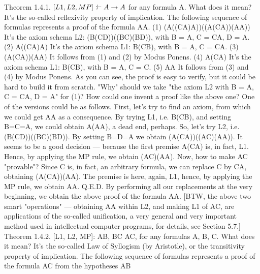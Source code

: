 Theorem 1.4.1. \([L1, L2, MP]: \vdash A\rightarrow A\) for any formula A. What does it mean? It's the so-called
reflexivity property of implication.
The following sequence of formulas represents a proof of the formula A\IMPLIES A.
(1) (A\IMPLIES ((C\IMPLIES A)\IMPLIES A))\IMPLIES ((A\IMPLIES (C\IMPLIES A))\IMPLIES (A\IMPLIES A)) It's the axiom schema L2: (B\IMPLIES (C\IMPLIES D))\IMPLIES ((B\IMPLIES C)\IMPLIES (B\IMPLIES D)), with B = A, C = C\IMPLIES A, D = A.  (2) A\IMPLIES ((C\IMPLIES A)\IMPLIES A) It's the axiom schema L1: B\IMPLIES (C\IMPLIES B), with B = A, C = C\IMPLIES A.  (3) (A\IMPLIES (C\IMPLIES A))\IMPLIES (A\IMPLIES A) It follows from (1) and (2) by Modus Ponens.  (4) A\IMPLIES (C\IMPLIES A) It's the axiom schema L1: B\IMPLIES (C\IMPLIES B), with B = A, C = C.  (5) A\IMPLIES A It follows from (3) and (4) by Modus Ponens.
As you can see, the proof is easy to verify, but it could be hard to build it from scratch. "Why" should we
take "the axiom L2 with B = A, C = C\IMPLIES A, D = A" for (1)?
How could one invent a proof like the above one? One of the versions could be as follows. First, let's try to find an axiom,
from which we could get A\IMPLIES A as a consequence. By trying L1, i.e. B\IMPLIES (C\IMPLIES B), and setting B=C=A, we could obtain
A\IMPLIES (A\IMPLIES A), a dead end, perhaps. So, let's try L2, i.e. (B\IMPLIES (C\IMPLIES D))\IMPLIES ((B\IMPLIES C)\IMPLIES (B\IMPLIES D)). By setting B=D=A we obtain
(A\IMPLIES (C\IMPLIES A))\IMPLIES ((A\IMPLIES C)\IMPLIES (A\IMPLIES A)). It seems to be a good decision --- because the first premise A\IMPLIES (C\IMPLIES A) is, in fact, L1.
Hence, by applying the MP rule, we obtain (A\IMPLIES C)\IMPLIES (A\IMPLIES A). Now, how to make A\IMPLIES C "provable"? Since C is, in fact, an
arbitrary formula, we can replace C by C\IMPLIES A, obtaining (A\IMPLIES (C\IMPLIES A))\IMPLIES (A\IMPLIES A). The premise is here, again, L1, hence, by
applying the MP rule, we obtain A\IMPLIES A. Q.E.D. By performing all our replacements at the very beginning, we obtain the above
proof of the formula A\IMPLIES A. [BTW, the above two smart "operations" --- obtaining A\IMPLIES A within L2, and making L1 of A\IMPLIES C,
are applications of the so-called unification, a very general and very important method used in intellectual computer programs,
for details, see Section 5.7.]
Theorem 1.4.2. [L1, L2, MP]: A\IMPLIES B, B\IMPLIES C \vdash A\IMPLIES C, for any formulas A, B, C. What does it mean? It's
the so-called Law of Syllogism (by Aristotle), or the transitivity property of implication.
The following sequence of formulas represents a proof of the formula A\IMPLIES C from the hypotheses A\IMPLIES B
